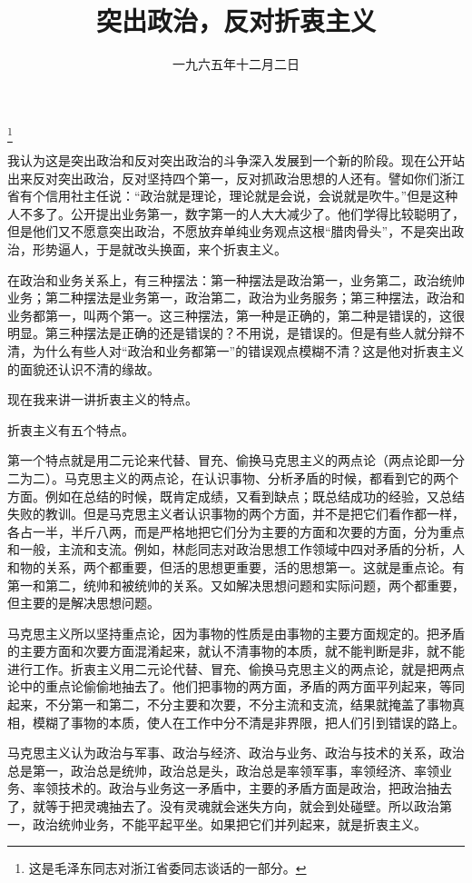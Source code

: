
\title{突出政治，反对折衷主义}
\date{一九六五年十二月二日}
\thanks{这是毛泽东同志对浙江省委同志谈话的一部分。}
\maketitle


我认为这是突出政治和反对突出政治的斗争深入发展到一个新的阶段。现在公开站出来反对突出政治，反对坚持四个第一，反对抓政治思想的人还有。譬如你们浙江省有个信用社主任说：“政治就是理论，理论就是会说，会说就是吹牛。”但是这种人不多了。公开提出业务第一，数字第一的人大大减少了。他们学得比较聪明了，但是他们又不愿意突出政治，不愿放弃单纯业务观点这根“腊肉骨头”，不是突出政治，形势逼人，于是就改头换面，来个折衷主义。

在政治和业务关系上，有三种摆法：第一种摆法是政治第一，业务第二，政治统帅业务；第二种摆法是业务第一，政治第二，政治为业务服务；第三种摆法，政治和业务都第一，叫两个第一。这三种摆法，第一种是正确的，第二种是错误的，这很明显。第三种摆法是正确的还是错误的？不用说，是错误的。但是有些人就分辩不清，为什么有些人对“政治和业务都第一”的错误观点模糊不清？这是他对折衷主义的面貌还认识不清的缘故。

现在我来讲一讲折衷主义的特点。

折衷主义有五个特点。

第一个特点就是用二元论来代替、冒充、偷换马克思主义的两点论（两点论即一分二为二）。马克思主义的两点论，在认识事物、分析矛盾的时候，都看到它的两个方面。例如在总结的时候，既肯定成绩，又看到缺点；既总结成功的经验，又总结失败的教训。但是马克思主义者认识事物的两个方面，并不是把它们看作都一样，各占一半，半斤八两，而是严格地把它们分为主要的方面和次要的方面，分为重点和一般，主流和支流。例如，林彪同志对政治思想工作领域中四对矛盾的分析，人和物的关系，两个都重要，但活的思想更重要，活的思想第一。这就是重点论。有第一和第二，统帅和被统帅的关系。又如解决思想问题和实际问题，两个都重要，但主要的是解决思想问题。

马克思主义所以坚持重点论，因为事物的性质是由事物的主要方面规定的。把矛盾的主要方面和次要方面混淆起来，就认不清事物的本质，就不能判断是非，就不能进行工作。折衷主义用二元论代替、冒充、偷换马克思主义的两点论，就是把两点论中的重点论偷偷地抽去了。他们把事物的两方面，矛盾的两方面平列起来，等同起来，不分第一和第二，不分主要和次要，不分主流和支流，结果就掩盖了事物真相，模糊了事物的本质，使人在工作中分不清是非界限，把人们引到错误的路上。

马克思主义认为政治与军事、政治与经济、政治与业务、政治与技术的关系，政治总是第一，政治总是统帅，政治总是头，政治总是率领军事，率领经济、率领业务、率领技术的。政治与业务这一矛盾中，主要的矛盾方面是政治，把政治抽去了，就等于把灵魂抽去了。没有灵魂就会迷失方向，就会到处碰壁。所以政治第一，政治统帅业务，不能平起平坐。如果把它们并列起来，就是折衷主义。

